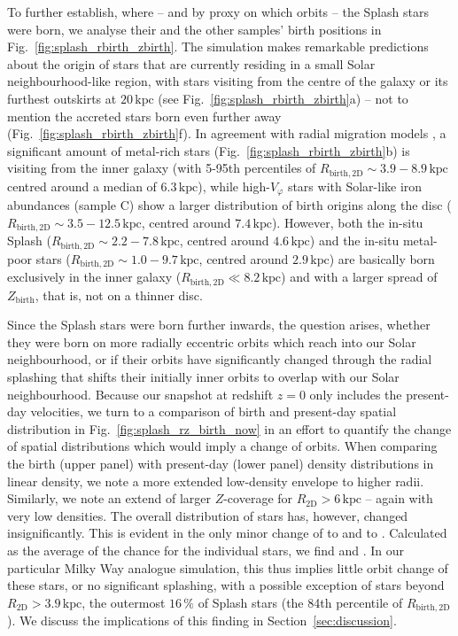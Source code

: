 \documentclass[fleqn,usenatbib]{mnras}
\begin{document}
To further establish, where -- and by proxy on which orbits -- the Splash stars were born, we analyse their and the other samples' birth positions in Fig.~\ref{fig:splash_rbirth_zbirth}. The simulation makes remarkable predictions about the origin of stars that are currently residing in a small Solar neighbourhood-like region, with stars visiting from the centre of the galaxy or its furthest outskirts at $20\,\mathrm{kpc}$ (see Fig.~\ref{fig:splash_rbirth_zbirth}a) -- not to mention the accreted stars born even further away (Fig.~\ref{fig:splash_rbirth_zbirth}f). In agreement with radial migration models \citep[for example][]{Frankel2018, Frankel2020}, a significant amount of metal-rich stars (Fig.~\ref{fig:splash_rbirth_zbirth}b) is visiting from the inner galaxy (with 5-95th percentiles of $R_\mathrm{birth, 2D} \sim 3.9 - 8.9\,\mathrm{kpc}$ centred around a median of $6.3\,\mathrm{kpc}$), while high-$V_\varphi$ stars with Solar-like iron abundances (sample C) show a larger distribution of birth origins along the disc ($R_\mathrm{birth, 2D} \sim 3.5-12.5\,\mathrm{kpc}$, centred around $7.4\,\mathrm{kpc}$). However, both the in-situ Splash ($R_\mathrm{birth, 2D} \sim 2.2-7.8\,\mathrm{kpc}$, centred around $4.6\,\mathrm{kpc}$) and the in-situ metal-poor stars ($R_\mathrm{birth, 2D} \sim 1.0-9.7\,\mathrm{kpc}$, centred around $2.9\,\mathrm{kpc}$) are basically born exclusively in the inner galaxy ($R_\mathrm{birth, 2D} \ll 8.2\,\mathrm{kpc}$) and with a larger spread of $Z_\mathrm{birth}$, that is, not on a thinner disc.

Since the Splash stars were born further inwards, the question arises, whether they were born on more radially eccentric orbits which reach into our Solar neighbourhood, or if their orbits have significantly changed through the radial splashing that shifts their initially inner orbits to overlap with our Solar neighbourhood. Because our snapshot at redshift $z = 0$ only includes the present-day velocities, we turn to a comparison of birth and present-day spatial distribution in Fig.~\ref{fig:splash_rz_birth_now} in an effort to quantify the change of spatial distributions which would imply a change of orbits. When comparing the birth (upper panel) with present-day (lower panel) density distributions in linear density, we note a more extended low-density envelope to higher radii. Similarly, we note an extend of larger $Z$-coverage for $R_\mathrm{2D} > 6\,\mathrm{kpc}$ -- again with very low densities. The overall distribution of stars has, however, changed insignificantly. This is evident in the only minor change of  to  and  to . Calculated as the average of the chance for the individual stars, we find  and . In our particular Milky Way analogue simulation, this thus implies little orbit change of these stars, or no significant splashing, with a possible exception of stars beyond $R_\mathrm{2D} > 3.9\,\mathrm{kpc}$, the outermost $16\,\mathrm{\%}$ of Splash stars (the 84th percentile of $R_\mathrm{birth,2D}$). We discuss the implications of this finding in Section~\ref{sec:discussion}.
\end{document}
